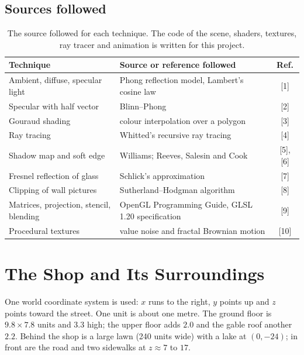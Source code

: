\documentclass[10pt,a4paper]{article}
\begin{document}
\subsection{Sources followed}
\begin{table}[htbp]
\centering\small
\begin{tabular}{@{}p{5.2cm}p{9.6cm}c@{}}
\toprule
\textbf{Technique} & \textbf{Source or reference followed} & \textbf{Ref.}\\
\midrule
Ambient, diffuse, specular light & Phong reflection model, Lambert's cosine law & [1]\\
Specular with half vector & Blinn--Phong & [2]\\
Gouraud shading & colour interpolation over a polygon & [3]\\
Ray tracing & Whitted's recursive ray tracing & [4]\\
Shadow map and soft edge & Williams; Reeves, Salesin and Cook & [5], [6]\\
Fresnel reflection of glass & Schlick's approximation & [7]\\
Clipping of wall pictures & Sutherland--Hodgman algorithm & [8]\\
Matrices, projection, stencil, blending & OpenGL Programming Guide, GLSL 1.20 specification & [9]\\
Procedural textures & value noise and fractal Brownian motion & [10]\\
\bottomrule
\end{tabular}
\caption{The source followed for each technique. The code of the scene, shaders, textures, ray tracer and animation is written for this project.}\label{tab:refs}
\end{table}

\section{The Shop and Its Surroundings}
One world coordinate system is used: $x$ runs to the right, $y$ points up and $z$ points toward the street. One unit is about one metre. The ground floor is $9.8 \times 7.8$ units and $3.3$ high; the upper floor adds $2.0$ and the gable roof another $2.2$. Behind the shop is a large lawn (240 units wide) with a lake at $(0,-24)$; in front are the road and two sidewalks at $z\approx 7$ to $17$.
\end{document}
